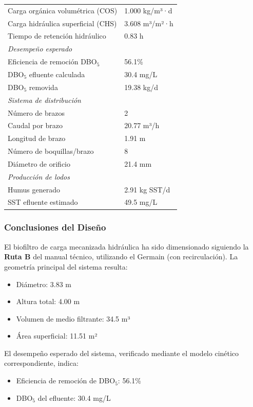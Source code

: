 \documentclass[12pt,a4paper]{article}
\begin{document}
\begin{longtable}{ll}
Carga orgánica volumétrica (COS) & 1.000 kg/m³·d \\
Carga hidráulica superficial (CHS) & 3.608 m³/m²·h \\
Tiempo de retención hidráulico & 0.83 h \\
\midrule
\multicolumn{2}{l}{\textit{Desempeño esperado}} \\
Eficiencia de remoción DBO$_5$ & 56.1\% \\
DBO$_5$ efluente calculada & 30.4 mg/L \\
DBO$_5$ removida & 19.38 kg/d \\
\midrule
\multicolumn{2}{l}{\textit{Sistema de distribución}} \\
Número de brazos & 2 \\
Caudal por brazo & 20.77 m³/h \\
Longitud de brazo & 1.91 m \\
Número de boquillas/brazo & 8 \\
Diámetro de orificio & 21.4 mm \\
\midrule
\multicolumn{2}{l}{\textit{Producción de lodos}} \\
Humus generado & 2.91 kg SST/d \\
SST efluente estimado & 49.5 mg/L \\
\end{longtable}
\endgroup

\subsubsection*{Conclusiones del Diseño}

El biofiltro de carga mecanizada hidráulica ha sido dimensionado siguiendo la \textbf{Ruta B} del manual técnico, utilizando el Germain (con recirculación). La geometría principal del sistema resulta:

\begin{itemize}[noitemsep,leftmargin=2em]
    \item Diámetro: 3.83 m
    \item Altura total: 4.00 m
    \item Volumen de medio filtrante: 34.5 m³
    \item Área superficial: 11.51 m²
\end{itemize}

El desempeño esperado del sistema, verificado mediante el modelo cinético correspondiente, indica:

\begin{itemize}[noitemsep,leftmargin=2em]
    \item Eficiencia de remoción de DBO$_5$: 56.1\%
    \item DBO$_5$ del efluente: 30.4 mg/L

\end{itemize}
\end{document}
